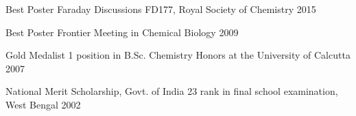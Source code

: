 

\begin{cvhonors}


\cvhonor
{Best Poster} %
{Faraday Discussions FD177, Royal Society of Chemistry} %
{} %
{2015} %


\cvhonor
{Best Poster} %
{Frontier Meeting in Chemical Biology} %
{} %
{2009} %


\cvhonor
{Gold Medalist} %
{1 position in B.Sc. Chemistry Honors at the University of Calcutta} %
{} %
{2007} %


\cvhonor
{National Merit Scholarship, Govt. of India} %
{23 rank in final school examination, West Bengal} %
{} %
{2002} %


\end{cvhonors}
